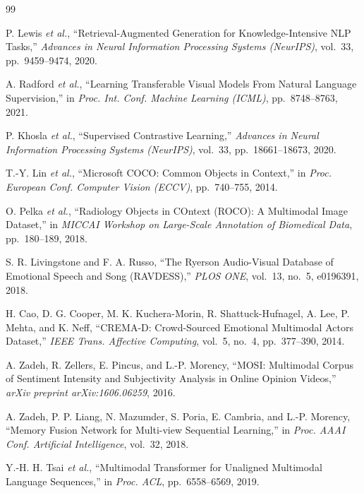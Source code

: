 \documentclass[10pt,conference]{IEEEtran}
\theoremstyle{ieeethm}
\theoremstyle{ieeedef}
\theoremstyle{ieeeremark}
\begin{document}
\balance

\begin{thebibliography}{99}

P. Lewis \textit{et al.},
``Retrieval-Augmented Generation for Knowledge-Intensive NLP Tasks,''
\textit{Advances in Neural Information Processing Systems (NeurIPS)}, vol.~33, pp.~9459--9474, 2020.

A. Radford \textit{et al.},
``Learning Transferable Visual Models From Natural Language Supervision,''
in \textit{Proc. Int. Conf. Machine Learning (ICML)}, pp.~8748--8763, 2021.

P. Khosla \textit{et al.},
``Supervised Contrastive Learning,''
\textit{Advances in Neural Information Processing Systems (NeurIPS)}, vol.~33, pp.~18661--18673, 2020.

T.-Y. Lin \textit{et al.},
``Microsoft COCO: Common Objects in Context,''
in \textit{Proc. European Conf. Computer Vision (ECCV)}, pp.~740--755, 2014.

O. Pelka \textit{et al.},
``Radiology Objects in COntext (ROCO): A Multimodal Image Dataset,''
in \textit{MICCAI Workshop on Large-Scale Annotation of Biomedical Data}, pp.~180--189, 2018.

S. R. Livingstone and F. A. Russo,
``The Ryerson Audio-Visual Database of Emotional Speech and Song (RAVDESS),''
\textit{PLOS ONE}, vol.~13, no.~5, e0196391, 2018.

H. Cao, D. G. Cooper, M. K. Kuchera-Morin, R. Shattuck-Hufnagel, A. Lee, P. Mehta, and K. Neff,
``CREMA-D: Crowd-Sourced Emotional Multimodal Actors Dataset,''
\textit{IEEE Trans. Affective Computing}, vol.~5, no.~4, pp.~377--390, 2014.

A. Zadeh, R. Zellers, E. Pincus, and L.-P. Morency,
``MOSI: Multimodal Corpus of Sentiment Intensity and Subjectivity Analysis in Online Opinion Videos,''
\textit{arXiv preprint arXiv:1606.06259}, 2016.

A. Zadeh, P. P. Liang, N. Mazumder, S. Poria, E. Cambria, and L.-P. Morency,
``Memory Fusion Network for Multi-view Sequential Learning,''
in \textit{Proc. AAAI Conf. Artificial Intelligence}, vol.~32, 2018.

Y.-H. H. Tsai \textit{et al.},
``Multimodal Transformer for Unaligned Multimodal Language Sequences,''
in \textit{Proc. ACL}, pp.~6558--6569, 2019.


\end{thebibliography}
\end{document}
